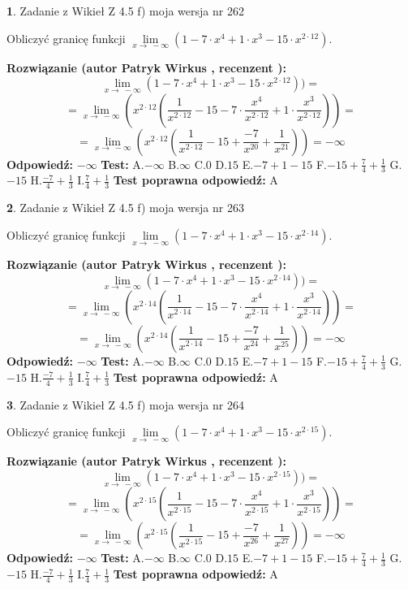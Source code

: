 \documentclass[12pt, a4paper]{article}
\theoremstyle{definition} %
\newtheorem{zad}{}
\newcommand{\zadStart}[1]{\begin{zad}#1\newline}
\newcommand{\zadStop}{\end{zad}}
\newcommand{\rozwStart}[2]{\noindent \textbf{Rozwiązanie (autor #1 , recenzent #2): }\newline}
\newcommand{\rozwStop}{\newline}
\newcommand{\odpStart}{\noindent \textbf{Odpowiedź:}\newline}
\newcommand{\odpStop}{\newline}
\newcommand{\testStart}{\noindent \textbf{Test:}\newline}
\newcommand{\testStop}{\newline}
\newcommand{\kluczStart}{\noindent \textbf{Test poprawna odpowiedź:}\newline}
\newcommand{\kluczStop}{\newline}
\begin{document}
\zadStart{Zadanie z Wikieł Z 4.5 f) moja wersja nr 262}



Obliczyć granicę funkcji  $\lim\limits_{x\to\ -\infty}(1 - 7 \cdot x^{4}+1 \cdot x^{3}- 15 \cdot x^{2\cdot12})$.
\zadStop
\rozwStart{Patryk Wirkus}{}
$$\lim\limits_{x\to\ -\infty}(1 - 7 \cdot x^{4}+1 \cdot x^{3}- 15 \cdot x^{2\cdot12}))=$$
$$=\lim\limits_{x\to\ -\infty}(x^{2\cdot12}(\frac{1}{x^{2\cdot12}}-15 -7 \cdot \frac{x^{4}}{x^{2\cdot12}}+1 \cdot \frac{x^{3}}{x^{2\cdot12}}))=$$
$$=\lim\limits_{x\to\ -\infty}(x^{2\cdot12}(\frac{1}{x^{2\cdot12}}-15 + \frac{-7}{x^{20}}+ \frac{1}{x^{21}}))=-\infty$$
\rozwStop
\odpStart
$-\infty$
\odpStop
\testStart
A.$-\infty$ B.$\infty$ C.$0$ D.$15$ E.$-7 + 1 - 15$
F.$-15+\frac{7}{4}+\frac{1}{3}$ G.$-15$
H.$\frac{-7}{4}+\frac{1}{3}$
I.$\frac{7}{4}+\frac{1}{3}$
\testStop
\kluczStart
A
\kluczStop



\zadStart{Zadanie z Wikieł Z 4.5 f) moja wersja nr 263}



Obliczyć granicę funkcji  $\lim\limits_{x\to\ -\infty}(1 - 7 \cdot x^{4}+1 \cdot x^{3}- 15 \cdot x^{2\cdot14})$.
\zadStop
\rozwStart{Patryk Wirkus}{}
$$\lim\limits_{x\to\ -\infty}(1 - 7 \cdot x^{4}+1 \cdot x^{3}- 15 \cdot x^{2\cdot14}))=$$
$$=\lim\limits_{x\to\ -\infty}(x^{2\cdot14}(\frac{1}{x^{2\cdot14}}-15 -7 \cdot \frac{x^{4}}{x^{2\cdot14}}+1 \cdot \frac{x^{3}}{x^{2\cdot14}}))=$$
$$=\lim\limits_{x\to\ -\infty}(x^{2\cdot14}(\frac{1}{x^{2\cdot14}}-15 + \frac{-7}{x^{24}}+ \frac{1}{x^{25}}))=-\infty$$
\rozwStop
\odpStart
$-\infty$
\odpStop
\testStart
A.$-\infty$ B.$\infty$ C.$0$ D.$15$ E.$-7 + 1 - 15$
F.$-15+\frac{7}{4}+\frac{1}{3}$ G.$-15$
H.$\frac{-7}{4}+\frac{1}{3}$
I.$\frac{7}{4}+\frac{1}{3}$
\testStop
\kluczStart
A
\kluczStop



\zadStart{Zadanie z Wikieł Z 4.5 f) moja wersja nr 264}



Obliczyć granicę funkcji  $\lim\limits_{x\to\ -\infty}(1 - 7 \cdot x^{4}+1 \cdot x^{3}- 15 \cdot x^{2\cdot15})$.
\zadStop
\rozwStart{Patryk Wirkus}{}
$$\lim\limits_{x\to\ -\infty}(1 - 7 \cdot x^{4}+1 \cdot x^{3}- 15 \cdot x^{2\cdot15}))=$$
$$=\lim\limits_{x\to\ -\infty}(x^{2\cdot15}(\frac{1}{x^{2\cdot15}}-15 -7 \cdot \frac{x^{4}}{x^{2\cdot15}}+1 \cdot \frac{x^{3}}{x^{2\cdot15}}))=$$
$$=\lim\limits_{x\to\ -\infty}(x^{2\cdot15}(\frac{1}{x^{2\cdot15}}-15 + \frac{-7}{x^{26}}+ \frac{1}{x^{27}}))=-\infty$$
\rozwStop
\odpStart
$-\infty$
\odpStop
\testStart
A.$-\infty$ B.$\infty$ C.$0$ D.$15$ E.$-7 + 1 - 15$
F.$-15+\frac{7}{4}+\frac{1}{3}$ G.$-15$
H.$\frac{-7}{4}+\frac{1}{3}$
I.$\frac{7}{4}+\frac{1}{3}$
\testStop
\kluczStart
A
\kluczStop
\end{document}
